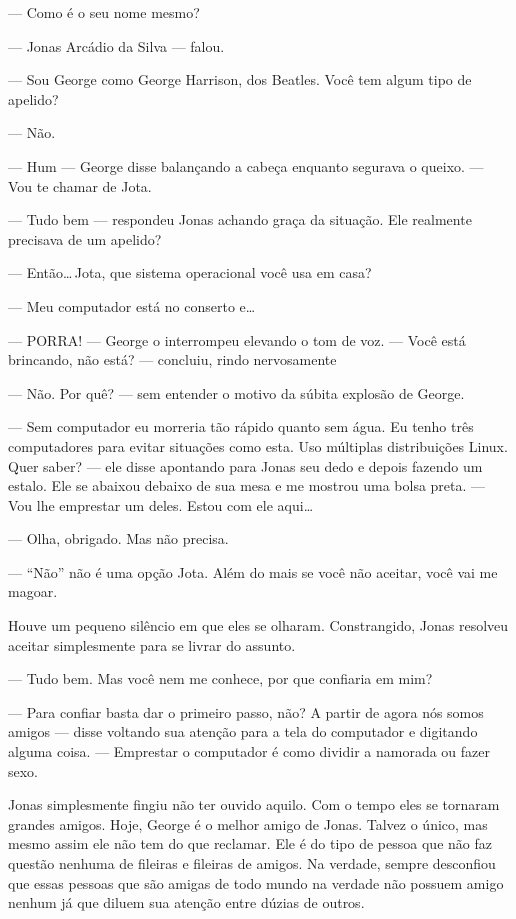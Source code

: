 --- Como é o seu nome mesmo?

--- Jonas Arcádio da Silva --- falou.

--- Sou George\mudanca{,} como George Harrison, dos Beatles. Você tem algum tipo de apelido?

--- Não.

--- Hum --- George disse balançando a cabeça enquanto segurava o queixo. --- Vou te chamar de Jota.

--- Tudo bem --- respondeu Jonas achando graça da situação. Ele realmente precisava de um apelido?

--- Então\ldots\,Jota, que sistema operacional você usa em casa?

--- Meu computador está no conserto e\ldots

--- PORRA! --- George o interrompeu elevando o tom de voz. --- Você está brincando, não está? --- concluiu, rindo nervosamente

--- Não. Por quê? --- sem entender o motivo da súbita explosão de George.

--- Sem computador eu morreria tão rápido quanto sem água. Eu tenho três computadores para evitar situações como esta. Uso múltiplas distribuições Linux. Quer saber? --- ele disse apontando para Jonas seu dedo e depois fazendo um estalo. Ele se abaixou debaixo de sua mesa e me mostrou uma bolsa preta. --- Vou lhe emprestar um deles. Estou com ele aqui\ldots

--- Olha, obrigado. Mas não precisa.

--- ``Não'' não é uma opção Jota. Além do mais se você não aceitar, você vai me magoar.

Houve um pequeno silêncio em que eles se olharam. Constrangido, Jonas resolveu aceitar simplesmente para se livrar do assunto.

--- Tudo bem. Mas você nem me conhece, por que confiaria em mim?

--- Para confiar basta dar o primeiro passo, não? A partir de agora nós somos amigos --- disse voltando sua atenção para a tela do computador e digitando alguma coisa. --- Emprestar o computador é como dividir a namorada ou fazer sexo.

Jonas simplesmente fingiu não ter ouvido aquilo. Com o tempo eles se tornaram grandes amigos. Hoje, George é o melhor amigo de Jonas. Talvez o único, mas mesmo assim ele não tem do que reclamar. Ele é do tipo de pessoa que não faz questão nenhuma de fileiras e fileiras de amigos. Na verdade, sempre desconfiou que essas pessoas que são amigas de todo mundo na verdade não possuem amigo nenhum já que diluem sua atenção entre dúzias de outros.

